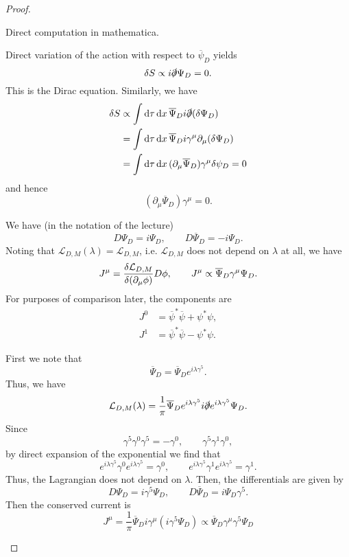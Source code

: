 \begin{proof}
	\begin{parts}
	\item Direct computation in mathematica.
	\item Direct variation of the action with respect to  $\overline{\psi}_D$ yields
		\[
		\delta S \propto i \slashed{\partial} \Psi_D = 0	
		.\] 
		This is the Dirac equation. Similarly, we have
		\begin{align*}
			\delta S &\propto \int \dd{\tau}\dd{x} \overline{\Psi}_D i \slashed{\partial}(\delta \Psi_D) \\
			&=\int \dd{\tau}\dd{x} \overline{\Psi}_D i \gamma^\mu\partial_\mu(\delta \Psi_D)\\
			&= \int \dd{\tau}\dd{x} (\partial_\mu \overline{\Psi}_D)\gamma^\mu \delta\psi_D=0
		\end{align*}
		and hence
		\[
		(\partial_\mu \overline{\Psi}_D)\gamma^\mu=0
		.\] 
	\item We have (in the notation of the lecture)
		\[
		D\Psi_D = i\Psi_D,\qquad D \overline{\Psi}_D = -i \Psi_D
		.\] 
		Noting that $\mathcal{L}_{D,M}(\lambda) = \mathcal{L}_{D,M}$, i.e. $\mathcal{L}_{D,M}$ does not depend on $\lambda$ at all, we have
		\[
		J^\mu = \fdv{\mathcal{L}_{D,M}}{(\partial_\mu \phi)}D\phi,\qquad J^\mu \propto \overline{\Psi}_D \gamma^\mu\Psi_D
		.\] 
		For purposes of comparison later, the components are
		\begin{align*}
			J^0 &= \overline{\psi}^* \overline{\psi} + \psi^*\psi, \\
			J^1 &= \overline{\psi}^* \overline{\psi} - \psi^*\psi. 
		\end{align*}
	\item First we note that
		\[
			\overline{\Psi}_D = \overline{\Psi}_D e^{i\lambda \gamma^5}
		.\] 
		Thus, we have
		\[
			\mathcal{L}_{D,M}(\lambda) = \frac{1}{\pi}\overline{\Psi}_D e^{i\lambda \gamma^5} i\slashed{\partial}e^{i\lambda \gamma^5} \Psi_D
		.\]
		Since
		\[
		\gamma^5 \gamma^0\gamma^5=-\gamma^0, \qquad \gamma^5 \gamma^1 \gamma^0
	,\]
	by direct expansion of the exponential we find that
	\[
		e^{i\lambda \gamma^5}\gamma^0 e^{i\lambda\gamma^5}=\gamma^0, \qquad e^{i\lambda \gamma^5}\gamma^1 e^{i\lambda\gamma^5}=\gamma^1
	.\] 
	Thus, the Lagrangian does not depend on $\lambda$. Then, the differentials are given by
	\[
	D\Psi_D = i\gamma^5 \Psi_D,\qquad D \overline{\Psi}_D = i\Psi_D \gamma^5
	.\] 
	Then the conserved current is
	\[
	J^\mu = \frac{1}{\pi}\overline{\Psi}_D i\gamma^\mu (i\gamma^5 \Psi_D) \propto \overline{\Psi}_D \gamma^\mu \gamma^5 \Psi_D
\]
\end{parts}
\end{proof}
